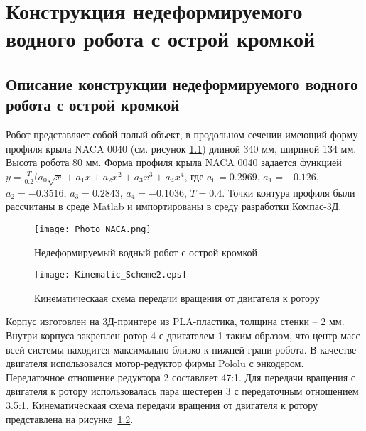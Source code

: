 \chapter{Конструкция недеформируемого водного робота с острой кромкой}\label{ch:ch5}

\section{Описание конструкции недеформируемого водного робота с острой кромкой}

Робот представляет собой полый объект, в продольном сечении имеющий форму профиля крыла NACA 0040 (см. рисунок \ref{Photo_NACA}) длиной 340 мм, шириной 134 мм. Высота робота 80 мм. Форма профиля крыла NACA 0040 задается функцией 
$ y = \frac{T}{0.2}(a_0\sqrt{x} + a_1x + a_2x^2 + a_3x^3 + a_4x^4 $, где $a_0=0.2969$, $a_1=-0.126$, $a_2=-0.3516$, $a_3=0.2843$, $a_4=-0.1036$, $T=0.4$. Точки контура профиля были рассчитаны в среде Matlab и импортированы в среду разработки Компас-3Д.	

\begin{figure}[h]
	\centering
	\texttt{[image: Photo\_NACA.png]}%
	\caption{Недеформируемый водный робот с острой кромкой}
	\label{Photo_NACA}
\end{figure}

\begin{figure}[h]
	\centering
	\texttt{[image: Kinematic\_Scheme2.eps]}%
	\caption{Кинематическаая схема передачи вращения от двигателя к ротору}
	\label{kinemSchemeNACA}
\end{figure}

Корпус изготовлен на 3Д-принтере из PLA-пластика, толщина стенки -- 2 мм. Внутри корпуса закреплен ротор 4 с двигателем 1 таким образом, что центр масс всей системы находится максимально близко к нижней грани робота. В качестве двигателя использовался мотор-редуктор фирмы Pololu с энкодером. Передаточное отношение редуктора 2 составляет 47:1. Для передачи вращения с двигателя к ротору использовалась пара шестерен 3 с передаточным отношением 3.5:1. Кинематическаая схема передачи вращения от двигателя к ротору представлена на рисунке~\ref{kinemSchemeNACA}.




